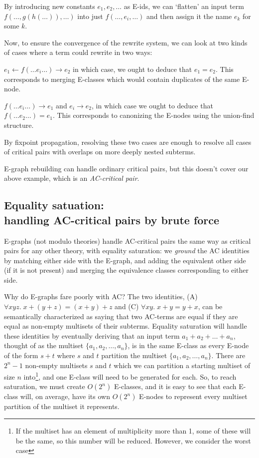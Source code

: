 \documentclass{article}
\theoremstyle{definition}
\begin{document}
By introducing new constants $e_1, e_2, \ldots$ as E-ids, we can `flatten' an input term $f(\ldots, g(h(\ldots)), \ldots)$ into just $f(\ldots, e_i, \ldots)$ and then assign it the name $e_k$ for some $k$. 

Now, to ensure the convergence of the rewrite system, we can look at two kinds of cases where a term could rewrite in two ways:

$e_1 \leftarrow f(\ldots e_i \ldots) \rightarrow e_2$ in which case, we ought to deduce that $e_1 = e_2$. This corresponds to merging E-classes which would contain duplicates of the same E-node.

$f(\ldots e_i \ldots) \rightarrow e_1$ and $e_i \rightarrow e_2$, in which case we ought to deduce that \\ $f(\ldots e_2 \ldots) = e_1$. This corresponds to canonizing the E-nodes using the union-find structure.

By fixpoint propagation, resolving these two cases are enough to resolve all cases of critical pairs with overlaps on more deeply nested subterms.

E-graph rebuilding can handle ordinary critical pairs, but this doesn't cover our above example, which is an \emph{AC-critical pair}. 

\subsection{Equality satuation: \\ handling AC-critical pairs by brute force}
E-graphs (not modulo theories) handle AC-critical pairs the same way as critical pairs for any other theory, with equality saturation: we \emph{ground} the AC identities by matching either side with the E-graph, and adding the equivalent other side (if it is not present) and merging the equivalence classes corresponding to either side.

Why do E-graphs fare poorly with AC? The two identities, (A) $\forall xyz.\; x + (y + z) = (x + y) + z$ and (C) $\forall xy.\; x + y = y + x$, can be semantically characterized as saying that two AC-terms are equal if they are equal as non-empty multisets of their subterms. Equality saturation will handle these identities by eventually deriving that an input term $a_1 + a_2 +  \ldots + a_n$, thought of as the multiset $\{a_1, a_2, \ldots, a_n\}$, is in the same E-class as every E-node of the form $s + t$ where $s$ and $t$ partition the multiset $\{a_1, a_2, \ldots, a_n\}$. There are $2^n - 1$ non-empty multisets $s$ and $t$ which we can partition a starting multiset of size $n$ into\footnote{If the multiset has an element of multiplicity more than 1, some of these will be the same, so this number will be reduced. However, we consider the worst case}, and one E-class will need to be generated for each. So, to reach saturation, we must create $O(2^n)$ E-classes, and it is easy to see that each E-class will, on average, have its own $O(2^n)$ E-nodes to represent every multiset partition of the multiset it represents.
\end{document}
